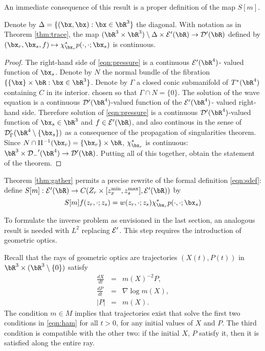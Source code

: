 An immediate consequence of this result is a proper definition of the
map $S[m]$.

\begin{theorem}
\label{thm:gather}
Denote by $\Delta = \{(\bx,\bx): \bx \in \bR^3\}$ the diagonal. With
notation as in Theorem \ref{thm:trace}, the map $(\bR^3 \times \bR^3)
\setminus \Delta \times {\cal E}'(\bR) \rightarrow {\cal D}'(\bR)$ defined by $(\bx_r,\bx_s,f)
\mapsto \chi_{\bx_r}^*p(\cdot,\cdot;\bx_s)$ is continuous. 
\end{theorem}
\begin{proof}
The right-hand side of \ref{eqn:pressure} is a continuous
${\cal E}'(\bR^4)$- valued function of $\bx_s$. Denote by $N$ the
normal bundle of the fibration $\{\{\bx\} \times \bR: \bx \in \bR^3\}$.
Denote by $\Gamma$ a closed conic submanifold of
$T^*(\bR^4)$ containing $C$ in its interior. chosen so that $\Gamma
\cap N=\{0\}$. The solution of the wave equation is a continuous
${\cal D}'(\bR^4)$-valued function of the ${\cal E}'(\bR^4)$- valued
right-hand side. Therefore solution of \ref{eqn:pressure} is a continuous
${\cal D}'(\bR^4)$-valued function of $\bx_s\in \bR^3$ and $f\in {\cal
  E}'(\bR)$, and also continous in the sense of 
${\cal D}_{\Gamma}'(\bR^4\setminus \{\bx_s\})$ as a consequence of the
propagation of singularities theorem. Since $N \cap \Pi^{-1}(\bx_r) =\{\bx_r\} \times \bR$,
$\chi_{\bx_r}^*$ is continuous: $\bR^3 \times {\cal D_{\Gamma}}'(\bR^4) \rightarrow
{\cal D}'(\bR)$. Putting all of this together, obtain the 
statement of the theorem. 
\end{proof}

Theorem \ref{thm:gather} permits a precise rewrite of the
formal definition \ref{eqn:sdef}: define $S[m]: {\cal E}'(\bR)
\rightarrow C(Z_r \times [z_x^{\rm min},z_s^{\rm max}], {\cal E}'(\bR))$ by 
\[
S[m]f(z_r,\cdot;z_s) = w(z_r,\cdot;z_s) \chi_{\bx_r}^*p(\cdot,\cdot;\bx_s)
\]

To formulate the inverse problem as envisioned in the last section, an
analogous result is needed with $L^2$ replacing ${\cal E}'$. This step
requires the introduction of geometric optics.

Recall that the rays of geometric optics are trajectories
$(X(t),P(t))$ in $\bR^3 \times (\bR^3 \setminus \{0\})$ satisfy 
\begin{eqnarray}
\label{eqn:ham}
\frac{dX}{dt} &=&m(X)^{-2}P,\nonumber \\
\frac{dP}{dt} &=&\nabla \log m(X), \nonumber\\
|P| &=& m(X).
\end{eqnarray}
The condition $m \in M$ implies that trajectories exist that solve the
first two conditions in \ref{eqn:ham} for all $t>0$, for any initial
values of $X$ and $P$. The third condition is compatible with the
other two: if the initial $X$, $P$ satisfy it, then it is satisfied
along the entire ray.

